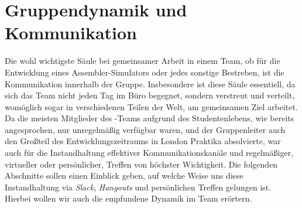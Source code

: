 
\section{Gruppendynamik und Kommunikation}
\label{team:group}

Die wohl wichtigste Säule bei gemeinsamer Arbeit in einem Team, ob für die
Entwicklung eines Assembler-Simulators oder jedes sonstige Bestreben, ist die
Kommunikation innerhalb der Gruppe. Insbesondere ist diese Säule essentiell,
da sich das Team nicht jeden Tag im Büro begegnet, sondern verstreut und
verteilt, womöglich sogar in verschiedenen Teilen der Welt, am gemeinsamen Ziel
arbeitet. Da die meisten Mitglieder des \erasim{}-Teams aufgrund des
Studentenlebens, wie bereits angesprochen, nur unregelmäßig verfügbar waren, und
der Gruppenleiter auch den Großteil des Entwicklungszeitraums in London Praktika
absolvierte, war auch für \erasim{} die Instandhaltung effektiver
Kommunikationskanäle und regelmäßiger, virtueller oder persönlicher, Treffen von
höchster Wichtigkeit. Die folgenden Abschnitte sollen einen Einblick geben, auf
welche Weise uns diese Instandhaltung via \emph{Slack}, \emph{Hangouts} und
persönlichen Treffen gelungen ist. Hierbei wollen wir auch die empfundene
Dynamik im Team erörtern.





